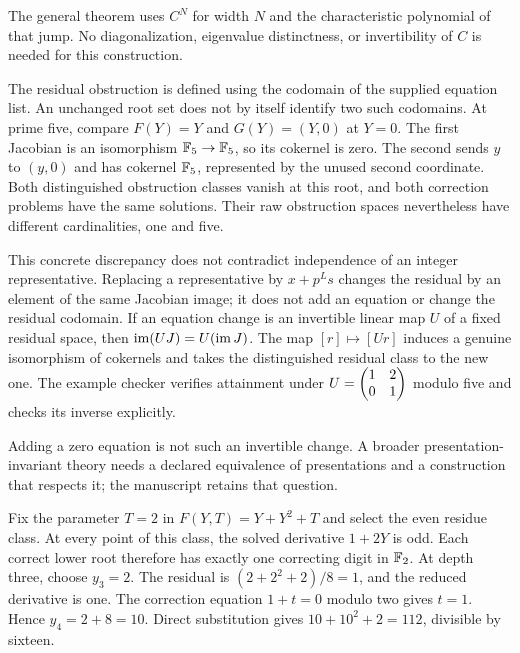 The general theorem uses $C^N$ for width $N$ and the characteristic polynomial of that jump. No diagonalization, eigenvalue distinctness, or invertibility of $C$ is needed for this construction.

The residual obstruction is defined using the codomain of the supplied equation list. An unchanged root set does not by itself identify two such codomains. At prime five, compare $F(Y)=Y$ and $G(Y)=(Y,0)$ at $Y=0$.
The first Jacobian is an isomorphism $\mathbb F_5\to\mathbb F_5$, so its cokernel is zero. The second sends $y$ to $(y,0)$ and has cokernel $\mathbb F_5$, represented by the unused second coordinate. Both distinguished obstruction classes vanish at this root, and both correction problems have the same solutions. Their raw obstruction spaces nevertheless have different cardinalities, one and five.

This concrete discrepancy does not contradict independence of an integer representative. Replacing a representative by $x+p^Ls$ changes the residual by an element of the same Jacobian image; it does not add an equation or change the residual codomain.
If an equation change is an invertible linear map $U$ of a fixed residual space, then $\operatorname{im}(UJ)=U(\operatorname{im} J)$. The map $[r]\mapsto[Ur]$ induces a genuine isomorphism of cokernels and takes the distinguished residual class to the new one. The example checker verifies attainment under $U=\begin{pmatrix}1&2\\0&1\end{pmatrix}$ modulo five and checks its inverse explicitly.

Adding a zero equation is not such an invertible change. A broader presentation-invariant theory needs a declared equivalence of presentations and a construction that respects it; the manuscript retains that question.

Fix the parameter $T=2$ in $F(Y,T)=Y+Y^2+T$ and select the even residue class. At every point of this class, the solved derivative $1+2Y$ is odd. Each correct lower root therefore has exactly one correcting digit in $\mathbb F_2$.
At depth three, choose $y_3=2$. The residual is $(2+2^2+2)/8=1$, and the reduced derivative is one. The correction equation $1+t=0$ modulo two gives $t=1$. Hence $y_4=2+8=10$. Direct substitution gives $10+10^2+2=112$, divisible by sixteen.

